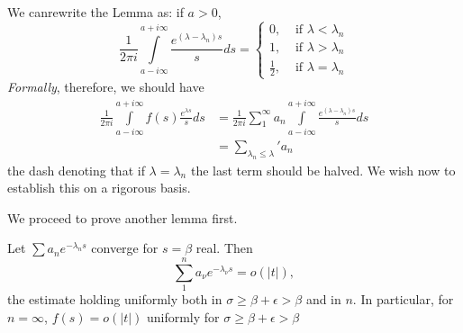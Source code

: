 \begin{remarks*}
We can\pageoriginale rewrite the Lemma as: if $a>0$,
$$
\frac{1}{2\pi i} \int\limits^{a+i\infty}_{a - i \infty}
\frac{e^{(\lambda - \lambda_n)s}}{s} ds = \begin{cases}
0, & \text{ if } \lambda < \lambda_n\\
1, & \text{ if } \lambda > \lambda_n\\
\frac{1}{2}, & \text{ if } \lambda = \lambda_n
\end{cases}
$$
{\em Formally}, therefore, we should have 
\begin{align*}
\frac{1}{2\pi i} \int\limits^{a+i\infty}_{a-i\infty} f (s)
\frac{e^{\lambda s}}{s} ds & = \frac{1}{2\pi i} \sum\limits^\infty_1
a_n \int\limits^{a+i\infty}_{a-i\infty}
\frac{e^{(\lambda-\lambda_n)s}}{s} ds\\
& = {\mathop{\sum\limits}_{\lambda_n \leq \lambda}} ' a_n
\end{align*}
the dash denoting that if $\lambda =\lambda_n$ the last term should be
halved. We wish now to establish this on a rigorous basis.

We proceed to prove another lemma first.
\end{remarks*}

\begin{lem}\label{chap10:lem2}
Let $\sum a_n e^{-\lambda_ns}$ converge for $s = \beta$ real. Then
$$
\sum\limits^n_1 a_\nu e^{-\lambda_\nu s} = o(|t|),
$$
the estimate holding uniformly both in $\sigma \geq \beta +
\epsilon > \beta$ and in $n$. In particular, for $n = \infty$,
$f(s)=o(|t|)$ uniformly for $\sigma \geq \beta + \epsilon > \beta$ 
\end{lem}


